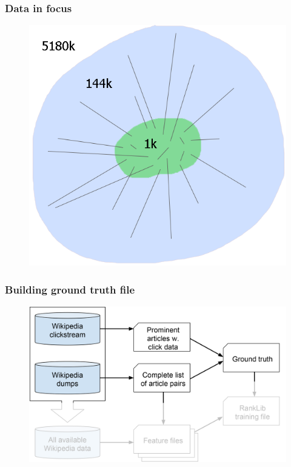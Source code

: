 \begin{frame}
  \frametitle{Data in focus}
  
    \begin{figure}[tbph]
    \centering
    \includegraphics[width=0.5\linewidth]{images/potato}
  \end{figure}
  
\end{frame}


\begin{frame}
  \frametitle{Building ground truth file}
  
    \begin{figure}[tbph]
    \centering
    \includegraphics[width=0.9\linewidth]{images/process_gtfocus}
  \end{figure}
  
\end{frame}

